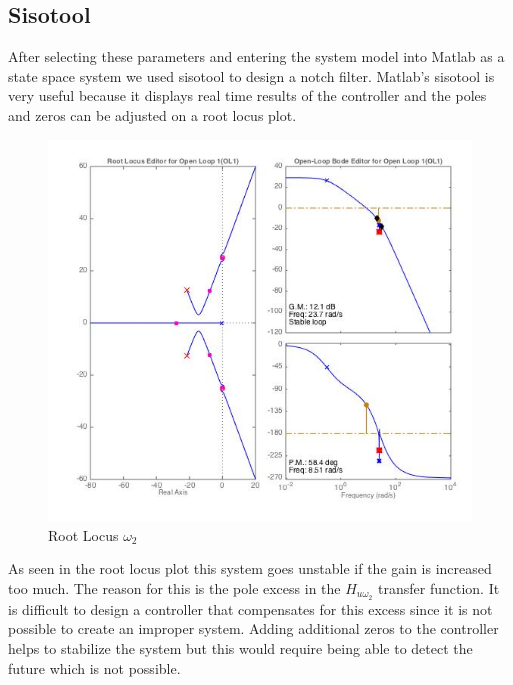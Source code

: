 \documentclass[11pt,titlepage]{article}
\begin{document}
	\subsection{Sisotool}
		After selecting these parameters and entering the system model into Matlab as a state space system we used sisotool to design a notch filter. Matlab's sisotool is very useful because it displays real time results of the controller and the poles and zeros can be adjusted on a root locus plot.
		\begin{figure}[H]
			\centering
			\includegraphics[scale=0.4]{rlocusw2}
			\caption{Root Locus $\omega_2$}
		\end{figure}
		As seen in the root locus plot this system goes unstable if the gain is increased too much. The reason for this is the pole excess in the $H_{u\omega_2}$ transfer function. It is difficult to design a controller that compensates for this excess since it is not possible to create an improper system. Adding additional zeros to the controller helps to stabilize the system but this would require being able to detect the future which is not possible.
\end{document}
